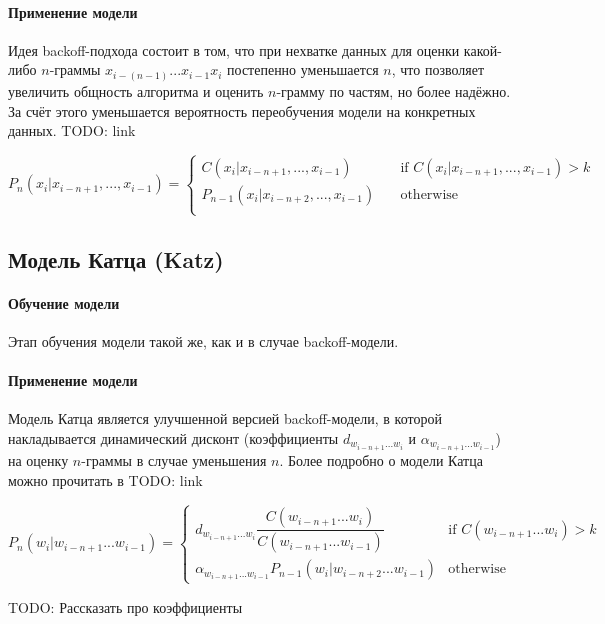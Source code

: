 \documentclass[14pt,russian]{extreport}
\theoremstyle{definition}
\newcommand{\todo}[1]{}
\renewcommand{\todo}[1]{{\color{red} TODO: {#1}}}
\begin{document}
\paragraph{ Применение модели } Идея backoff-подхода состоит в том, что при нехватке данных для оценки какой-либо $n$-граммы $x_{i - (n - 1)} ... x_{i - 1} x_i$ постепенно уменьшается $n$, что позволяет увеличить общность алгоритма и оценить $n$-грамму по частям, но более надёжно. За счёт этого уменьшается вероятность переобучения модели на конкретных данных. \todo{link}

\[ P_n(x_i | x_{i - n + 1}, ..., x_{i - 1}) =
\begin{cases}
	C(x_i | x_{i - n + 1}, ..., x_{i - 1})       & \quad \text{if } C(x_i | x_{i - n + 1}, ..., x_{i - 1}) > k\\
	P_{n - 1}(x_i | x_{i - n + 2}, ..., x_{i - 1})  & \quad \text{otherwise }\\
\end{cases}
\]

\subsection{ Модель Катца (Katz) }

\paragraph{ Обучение модели } Этап обучения модели такой же, как и в случае backoff-модели.

\paragraph{ Применение модели } Модель Катца является улучшенной версией backoff-модели, в которой накладывается динамический дисконт (коэффициенты $d_{w_{i-n+1}...w_i}$ и $\alpha_{w_{i-n+1}...w_{i-1}}$) на оценку $n$-граммы в случае уменьшения $n$. Более подробно о модели Катца можно прочитать в \todo{link}

\[
P_{n}\left( w_i | w_{i-n+1}...w_{i-1} \right) = 
\begin{cases}
d_{w_{i-n+1}...w_i} \dfrac{C(w_{i-n+1}...w_i)}{C(w_{i-n+1}...w_{i-1})} &\text{if $C(w_{i-n+1}...w_i) > k$}\\
\alpha_{w_{i-n+1}...w_{i-1}} P_{n - 1}\left( w_i | w_{i-n+2}...w_{i-1} \right) &\text{otherwise}
\end{cases}
\]

\todo{Рассказать про коэффициенты}
\end{document}
